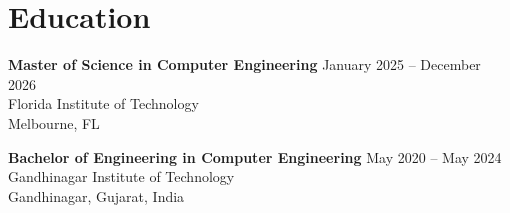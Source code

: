 \documentclass[a4paper,10pt]{article}
\begin{document}
\section*{Education}

\textbf{Master of Science in Computer Engineering} \hfill January 2025 -- December 2026\\
Florida Institute of Technology\\
Melbourne, FL

\vspace{3pt}

\textbf{Bachelor of Engineering in Computer Engineering} \hfill May 2020 -- May 2024\\
Gandhinagar Institute of Technology\\
Gandhinagar, Gujarat, India
\end{document}
